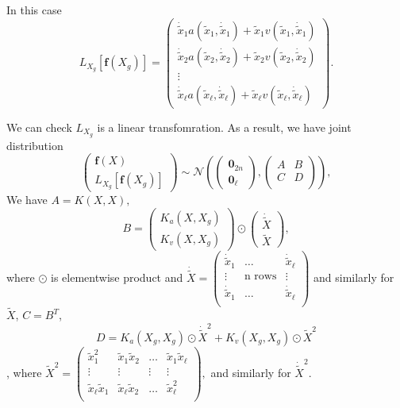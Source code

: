 \documentclass{article}
\begin{document}
In this case $$L_{X_g}[\mathbf{f}(X_g)]=\begin{pmatrix}
  \dot{\tilde{x}}_1a(\tilde{x}_1, \dot{\tilde{x}}_1) +\tilde{x}_1v(\tilde{x}_1, \dot{\tilde{x}}_1) \\ \dot{\tilde{x}}_2a(\tilde{x}_2, \dot{\tilde{x}}_2)+\tilde{x}_2v(\tilde{x}_2, \dot{\tilde{x}}_2) \\ \vdots \\ \dot{\tilde{x}}_{\ell}a(\tilde{x}_{\ell}, \dot{\tilde{x}}_{\ell})+\tilde{x}_{\ell}v(\tilde{x}_{\ell}, \dot{\tilde{x}}_{\ell})
\end{pmatrix}.$$

We can check $L_{X_g}$ is a linear transfomration. 
As a result, we have joint distribution
$$
\begin{pmatrix}
  \mathbf{f}(X) \\ L_{X_g}[\mathbf{f}(X_g)]
\end{pmatrix}
\sim \mathcal{N}
\left(
\begin{pmatrix}
  \mathbf{0}_{2n} \\ \mathbf{0}_{\ell}
\end{pmatrix},
\begin{pmatrix}
A & B \\C&D\\
\end{pmatrix}
\right), 
$$
We have 
$ A=K(X, X),$
$$
B = \begin{pmatrix}
  K_a(X, X_g) \\ K_v(X, X_g) \end{pmatrix}
  \odot \begin{pmatrix}
    \dot{\tilde{X}} \\ \tilde{X}
  \end{pmatrix}, 
$$
where $\odot$ is elementwise product and $\dot{\tilde{X}}=\begin{pmatrix}
  \dot{\tilde{x}}_1  & \dots & \dot{\tilde{x}}_{\ell}  \\
  \vdots & \text{n rows} &  \vdots\\
  \dot{\tilde{x}}_1  & \dots & \dot{\tilde{x}}_{\ell} \\
\end{pmatrix}$ and similarly for $\tilde{X}$, 
$C=B^T$, 
$$
D = K_a(X_g, X_g) \odot \dot{\tilde{X}}^2 + K_v(X_g, X_g) \odot \tilde{X}^2
$$, 
where $\tilde{X}^2=\begin{pmatrix}
  \tilde{x}_1^2 & \tilde{x}_1\tilde{x}_2 & \dots & \tilde{x}_1\tilde{x}_{\ell} \\
  \vdots & \vdots & \vdots & \vdots \\
  \tilde{x}_{\ell}\tilde{x}_1 & \tilde{x}_{\ell}\tilde{x}_2 & \dots & \tilde{x}_{\ell}^2 \\
\end{pmatrix},$ and similarly for $\dot{\tilde{X}}^2.$
\end{document}
